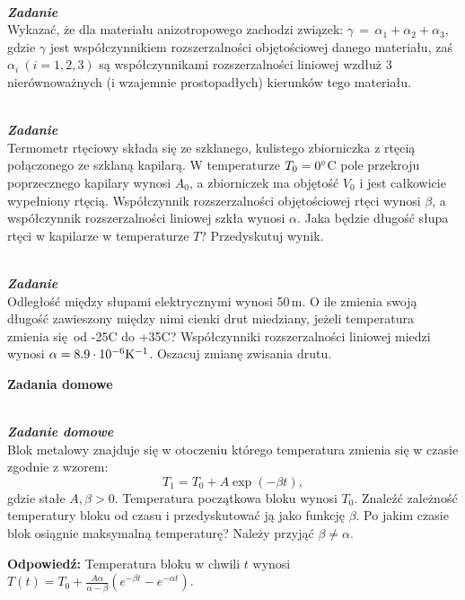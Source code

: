 \documentclass[11pt,a4paper]{article}
\newcounter{zadanie}\newcommand{\zadanie}[1][]{\addtocounter{zadanie}{1} ~\\  {\bf \emph{Zadanie \arabic{zadanie} #1 }} \\}
\newcounter{zaddom}\newcommand{\zaddom}[1][]{\addtocounter{zaddom}{1} ~\\  {\bf \emph{Zadanie domowe \arabic{zaddom} #1 }} \\}
\begin{document}
\zadanie
Wykazać, że dla materiału anizotropowego zachodzi związek:
$\gamma\,=\,\alpha_1+\alpha_2+\alpha_3$, gdzie $\gamma$ jest współczynnikiem rozszerzalności objętościowej danego materiału, zaś $\alpha_i ~(i=1,2,3)$
są współczynnikami rozszerzalności liniowej wzdłuż 3 
nierównoważnych (i wzajemnie prostopadłych) kierunków tego materiału.


\vskip 2pt


\zadanie
Termometr rtęciowy składa się ze szklanego, kulistego zbiorniczka z rtęcią połączonego ze szklaną kapilarą. W temperaturze $T_0=0\degree$C
pole przekroju poprzecznego kapilary wynosi $A_0$,
a zbiorniczek ma objętość $V_0$ i jest całkowicie wypełniony rtęcią. Współczynnik rozszerzalności
objętościowej rtęci wynosi $\beta$, a współczynnik rozszerzalności
liniowej szkła wynosi $\alpha$. Jaka będzie długość słupa rtęci w kapilarze w temperaturze $T$? Przedyskutuj wynik.

\vskip 2pt
\zadanie
Odległość między słupami elektrycznymi wynosi 50\,m.
O ile zmienia swoją długość zawieszony między nimi cienki drut miedziany,
jeżeli temperatura zmienia się od -25\degree C do +35\degree C?
Współczynniki rozszerzalności liniowej miedzi wynosi $\alpha = 8.9\cdot 10^{-6} {\rm K}^{-1}$.
Oszacuj zmianę zwisania drutu.


\vskip 5pt



\vspace*{5mm}
\begin{centering}
\bf{ Zadania domowe } \\[1mm]
\end{centering}

\zaddom 
Blok metalowy znajduje się w otoczeniu
którego temperatura zmienia się w czasie zgodnie z wzorem:\\
\[T_1=T_0+A\exp(-\beta t),\] gdzie stałe $A,\beta>0$. 
Temperatura początkowa bloku wynosi $T_0$. Znaleźć zależność
temperatury bloku od czasu i przedyskutować ją jako funkcję
$\beta$. Po jakim czasie blok osiągnie maksymalną
temperaturę? Należy przyjąć $\beta \ne \alpha$.

\vskip 10pt

\textbf{Odpowiedź:} Temperatura bloku w chwili $t$ wynosi $T(t) = T_0 + \frac{A\alpha}{\alpha - \beta}\left(e^{-\beta t} - e^{-\alpha t}\right)$.
\end{document}
